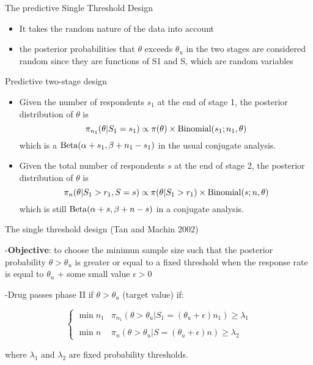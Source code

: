 \documentclass{beamer}
\begin{document}
\begin{frame}{The predictive Single Threshold Design}

\begin{itemize}
\itemsep1pt\parskip0pt
\item
  It takes the random nature of the data into account
\item
  the posterior probabilities that \(\theta\) exceeds \(\theta_u\) in
  the two stages are considered random since they are functions of S1
  and S, which are random variables
\end{itemize}

\end{frame}

\begin{frame}{Predictive two-stage design}

\begin{itemize}
\item
  Given the number of respondents \(s_1\) at the end of stage 1, the
  posterior distribution of \(\theta\) is \[
  \pi_{n_1}(\theta \vert S_1=s_1)\propto \pi(\theta)\times{\rm Binomial}(s_1; n_1, \theta)
  \] which is a \({\rm Beta}(\alpha+s_1, \beta+n_1-s_1)\) in the usual
  conjugate analysis.
\item
  Given the total number of respondents \(s\) at the end of stage 2, the
  posterior distribution of \(\theta\) is \[
  \pi_n(\theta \vert S_1>r_1, S=s)\propto \pi(\theta\vert S_1>r_1)\times{\rm Binomial}(s; n, \theta)
  \] which is still \({\rm Beta}(\alpha+s, \beta+n-s)\) in a conjugate
  analysis.
\end{itemize}

\end{frame}



\begin{frame}{The single threshold design (Tan and Machin 2002)}

-\textbf{Objective}: to choose the minimun sample size such that the
posterior probability \(\theta>\theta_u\) is greater or equal to a fixed
threshold when the response rate is equal to \(\theta_u\) + some small
value \(\epsilon>0\)

-Drug passes phase II if \(\theta> \theta_u\) (target value) if:

\[\left\{\begin{array}{ll}\min n_1 & \pi_{n_1}(\theta >\theta_u \vert  S_1=(\theta_u+\epsilon)n_1)\geq\lambda_1\\
 & \\
\min n & \pi_n(\theta>\theta_u\vert S=(\theta_u+\epsilon)n)\geq\lambda_2
\end{array}\right.
\]

where \(\lambda_1\) and \(\lambda_2\) are fixed probability thresholds.

\end{frame}
\end{document}
